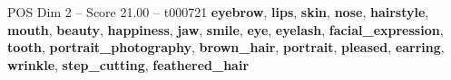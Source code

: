 \begin{textsample}{POS Dim 2 – Score 21.00 – t000721}  \label{ex:f2_pos_023}
\textbf{eyebrow}, \textbf{lips}, \textbf{skin}, \textbf{nose}, \textbf{hairstyle}, \textbf{mouth}, \textbf{beauty}, \textbf{happiness}, \textbf{jaw}, \textbf{smile}, \textbf{eye}, \textbf{eyelash}, \textbf{facial\_expression}, \textbf{tooth}, \textbf{portrait\_photography}, \textbf{brown\_hair}, \textbf{portrait}, \textbf{pleased}, \textbf{earring}, \textbf{wrinkle}, \textbf{step\_cutting}, \textbf{feathered\_hair}

\end{textsample}
